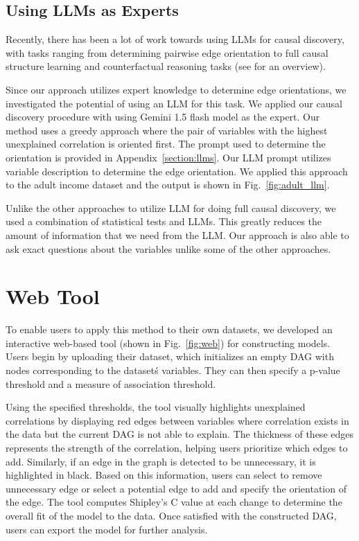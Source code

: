 \documentclass{uai2025} %
\begin{document}
\subsection{Using LLMs as Experts}
Recently, there has been a lot of work towards using LLMs for causal discovery,
with tasks ranging from determining pairwise edge orientation
\citep{Kiciman2023, Jin2024} to full causal structure learning \citep{Naik2023,
Vashishtha2023} and counterfactual reasoning tasks\citep{Kiciman2023} (see
\citet{Liu2024} for an overview).

Since our approach utilizes expert knowledge to determine edge orientations, we
investigated the potential of using an LLM for this task. We applied our causal
discovery procedure with using Gemini 1.5 flash model as the expert. Our method
uses a greedy approach where the pair of variables with the highest unexplained
correlation is oriented first. The prompt used to determine the orientation is
provided in Appendix~\ref{section:llms}. Our LLM prompt utilizes variable
description to determine the edge orientation. We applied this approach to the
adult income dataset and the output is shown in Fig.~\ref{fig:adult_llm}. 

Unlike the other approaches to utilize LLM for doing full causal discovery, we 
used a combination of statistical tests and LLMs. This greatly reduces the
amount of information that we need from the LLM. Our approach is also able to 
ask exact questions about the variables unlike some of the other approaches.

\section{Web Tool}
\label{sec:web}
To enable users to apply this method to their own datasets, we developed an
interactive web-based tool (shown in Fig.~\ref{fig:web}) for constructing
models. Users begin by uploading their dataset, which initializes an empty DAG
with nodes corresponding to the dataset\'s variables. They can then specify a
p-value threshold and a measure of association threshold.

Using the specified thresholds, the tool visually highlights unexplained
correlations by displaying red edges between variables where correlation exists
in the data but the current DAG is not able to explain. The thickness of these
edges represents the strength of the correlation, helping users prioritize
which edges to add. Similarly, if an edge in the graph is detected to be
unnecessary, it is highlighted in black. Based on this information, users can
select to remove unnecessary edge or select a potential edge to add and specify
the orientation of the edge. The tool computes Shipley’s C \citep{Shipley2000}
value at each change to determine the overall fit of the model to the data.
Once satisfied with the constructed DAG, users can export the model for further
analysis.
\end{document}
